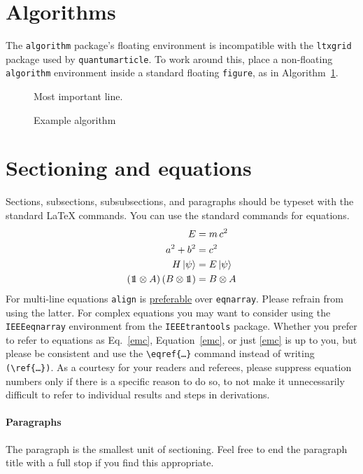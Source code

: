 \documentclass[a4paper,twocolumn,11pt,accepted=2017-05-09]{quantumarticle}
\begin{document}
\section{Algorithms}
The \texttt{algorithm} package's floating environment is incompatible with the \texttt{ltxgrid} package used by \texttt{quantumarticle}. To work around this, place a non-floating \texttt{algorithm} environment inside a standard floating \texttt{figure}, as in Algorithm~\ref{alg:example}.
\begin{figure}[t]
  \begin{algorithm}[H]
    \caption{Example algorithm}
    \label{alg:example}
    \begin{algorithmic}
      \State Most important line.
    \end{algorithmic}
  \end{algorithm}
\end{figure}

\section{Sectioning and equations}
Sections, subsections, subsubsections, and paragraphs should be typeset with the standard LaTeX commands.
You can use the standard commands for equations.
\begin{align}
  \label{emc}
  E &= m\,c^2\\
  a^2 + b^2 &= c^2\\
  H\,|\psi\rangle &= E\,|\psi\rangle\\
  (\openone \otimes A)\,(B \otimes \openone) &= B \otimes A
\end{align}
For multi-line equations \texttt{align} is \href{http://tex.stackexchange.com/questions/196/eqnarray-vs-align}{preferable} over \texttt{eqnarray}.
Please refrain from using the latter.
For complex equations you may want to consider using the \texttt{IEEEeqnarray} environment from the \texttt{IEEEtrantools} package.
Whether you prefer to refer to equations as Eq.~\eqref{emc}, Equation~\ref{emc}, or just \eqref{emc} is up to you, but please be consistent and use the \texttt{\textbackslash{}eqref\{\dots\}} command instead of writing \texttt{(\textbackslash{}ref\{\dots\})}.
As a courtesy for your readers and referees, please suppress equation numbers only if there is a specific reason to do so, to not make it unnecessarily difficult to refer to individual results and steps in derivations.

\paragraph{Paragraphs}
The paragraph is the smallest unit of sectioning.
Feel free to end the paragraph title with a full stop if you find this appropriate.
\end{document}
